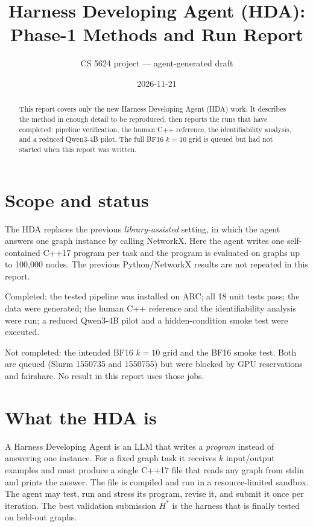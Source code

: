 \documentclass[11pt]{article}
\title{Harness Developing Agent (HDA): Phase-1 Methods and Run Report}
\author{CS 5624 project --- agent-generated draft}
\date{2026-11-21}
\begin{document}
\maketitle

\begin{abstract}
This report covers only the new Harness Developing Agent (HDA) work. It
describes the method in enough detail to be reproduced, then reports the runs
that have completed: pipeline verification, the human C++ reference, the
identifiability analysis, and a reduced Qwen3-4B pilot. The full BF16
$k=10$ grid is queued but had not started when this report was written.
\end{abstract}

\section{Scope and status}

The HDA replaces the previous \emph{library-assisted} setting, in which the
agent answers one graph instance by calling NetworkX. Here the agent writes one
self-contained C++17 program per task and the program is evaluated on graphs up
to 100{,}000 nodes. The previous Python/NetworkX results are not repeated in
this report.

Completed: the tested pipeline was installed on ARC; all 18 unit tests pass;
the data were generated; the human C++ reference and the identifiability
analysis were run; a reduced Qwen3-4B pilot and a hidden-condition smoke test
were executed.

Not completed: the intended BF16 $k=10$ grid and the BF16 smoke test. Both are
queued (Slurm 1550735 and 1550755) but were blocked by GPU reservations and
fairshare. No result in this report uses those jobs.

\section{What the HDA is}

A Harness Developing Agent is an LLM that writes a \emph{program} instead of
answering one instance. For a fixed graph task it receives $k$ input/output
examples and must produce a single C++17 file that reads any graph from stdin
and prints the answer. The file is compiled and run in a resource-limited
sandbox. The agent may test, run and stress its program, revise it, and submit
it once per iteration. The best validation submission $H^*$ is the harness that
is finally tested on held-out graphs.
\end{document}
